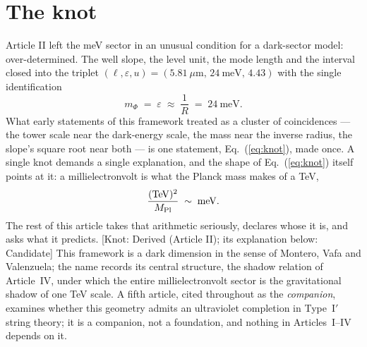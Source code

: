 \begin{abstract}
$\Lambda^{1/4}/\mu=0.093\approx1/4\pi$, so the hierarchy between the dark-energy scale and the sector scale is a loop factor, not a new scale --- below $\MS$ the framework contains no free scale at all. The experimental consequence is a triangle: the torsion balance reads the radion window, which \emph{is} a window on $\MS$ (3.5--9.8~TeV); a next-generation collider reads $\MS$ directly; and LISA reads the transition dynamics at the same scale. Two instruments that have never shared a parameter would be measuring the same number from two ends, with a third to arbitrate. The article ends with the complete map of the framework --- what is derived, what is candidate, what is input and natural, what is measured, what only data can decide, and what is inherited from the cosmological constant --- and with the compiled list of everything that kills it.
\end{abstract}

\section{The knot}
Article II left the meV sector in an unusual condition for a dark-sector model: over-determined. The well slope, the level unit, the mode length and the interval closed into the triplet $(\ell,\varepsilon,u)=(5.81~\mu\mathrm{m},\,24~\mathrm{meV},\,4.43)$ with the single identification
\begin{equation}
m_{\Phi}\;=\;\varepsilon\;\approx\;\frac{1}{R}\;=\;24~\mathrm{meV}.
\label{eq:knot}
\end{equation}
What early statements of this framework treated as a cluster of coincidences --- the tower scale near the dark-energy scale, the mass near the inverse radius, the slope's square root near both --- is one statement, Eq.~(\ref{eq:knot}), made once. A single knot demands a single explanation, and the shape of Eq.~(\ref{eq:knot}) itself points at it: a millielectronvolt is what the Planck mass makes of a TeV,
\begin{equation}
\frac{(\mathrm{TeV})^{2}}{M_{\rm Pl}}\;\sim\;\mathrm{meV}.
\end{equation}
The rest of this article takes that arithmetic seriously, declares whose it is, and asks what it predicts. [Knot: Derived (Article II); its explanation below: Candidate] This framework is a dark dimension in the sense of Montero, Vafa and Valenzuela; the name records its central structure, the shadow relation of Article~IV, under which the entire millielectronvolt sector is the gravitational shadow of one TeV scale. A fifth article, cited throughout as the \emph{companion}, examines whether this geometry admits an ultraviolet completion in Type~I$'$ string theory; it is a companion, not a foundation, and nothing in Articles~I--IV depends on it.

